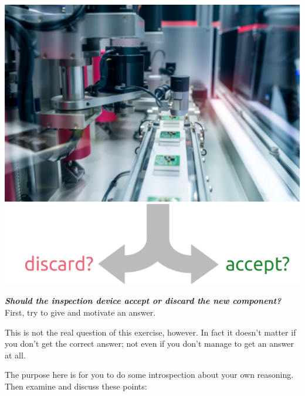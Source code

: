 \documentclass[
  a4paper,
  DIV=11,
  numbers=noendperiod,
  oneside]{scrreprt}
\begin{document}
\begin{marginfigure}

{\centering \includegraphics[width=1\textwidth,height=\textheight]{accept_discard.png}

}

\end{marginfigure}

{\textbf{\emph{Should the inspection device accept or discard the new
component?}}}\\

First, try to give and motivate an answer.

This is not the real question of this exercise, however. In fact it
doesn't matter if you don't get the correct answer; not even if you
don't manage to get an answer at all.

The purpose here is for you to do some introspection about your own
reasoning. Then examine and discuss these points:
\end{document}
